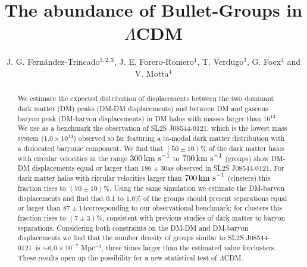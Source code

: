 \documentclass{emulateapj}
\newcommand{\hkpc}{{\ifmmode{h^{-1}{\rm kpc}}\else{$h^{-1}$kpc }\fi}}
\newcommand{\hMsun}{{\ifmmode{h^{-1}{\rm {M_{\odot}}}}\else{$h^{-1}{\rm{M_{\odot}}}$}\fi}}
\newcommand{\kms}{{\ifmmode{{\mathrm{\,km\ s}^{-1}}}\else{\,km~s$^{-1}$}\fi}}
\newcommand{\bullg}{SL2S J08544-0121}
\begin{document}
 

\title{The abundance of Bullet-Groups in $\Lambda$CDM}
\author{J. G. Fern\'andez-Trincado$^{1,2,3}$, J. E. Forero-Romero$^1$,
  T. Verdugo$^3$, G. Foex$^4$ and V. Motta$^4$} 
\begin{abstract}

We estimate the expected distribution of displacements between the two
dominant dark matter (DM) peaks (DM-DM displacements) and between
DM and gaseous baryon peak (DM-baryon displacements) in DM halos 
with masses larger than $10^{13}$\hMsun. We use as a benchmark the
observation of \bullg, which is the lowest mass system ($1.0\times
10^{14}$\hMsun) observed so far
featuring a bi-modal dark matter distribution with a dislocated
baryonic component. We find that $(50 \pm 10)\%$ of the dark matter
halos with circular velocities in the range $300\kms$ to $700\kms$
(groups) show DM-DM displacements equal or larger than $186 \pm
30$\hkpc as observed in \bullg. For dark matter halos with circular
velocities larger than $700\kms$ (clusters) this fraction rises to
$(70 \pm 10)\%$. Using the same simulation we estimate the DM-baryon
displacements and find that $0.1$ to $1.0\%$ of the groups should
present separations equal or larger than $87\pm 14$\hkpc corresponding
to our observational benchmark; for clusters this fraction rises to
$(7\pm 3)\%$, consistent with previous studies of dark matter to
baryon separations. Considering both constraints on the DM-DM and
DM-baryon displacements we find that the number density of groups
similar to \bullg\ is $\sim 6.0\times 10^{-7}$ Mpc$^{-3}$, three times
larger than the estimated value forclusters. These results open up
the possibility for a new statistical test of $\Lambda$CDM.     
\end{abstract}

\end{document}

